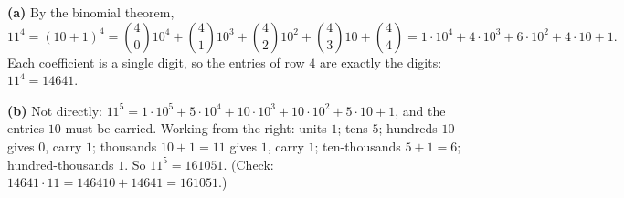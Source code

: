 \textbf{(a)} By the binomial theorem,
\[11^4=(10+1)^4=\binom40 10^4+\binom41 10^3+\binom42 10^2+\binom43 10+\binom44=1\cdot10^4+4\cdot10^3+6\cdot10^2+4\cdot10+1 .\]
Each coefficient is a single digit, so the entries of row $4$ are exactly the digits: $11^4=\boxed{14641}$.

\textbf{(b)} Not directly: $11^5=1\cdot10^5+5\cdot10^4+10\cdot10^3+10\cdot10^2+5\cdot10+1$, and the entries $10$ must be carried. Working from the right: units $1$; tens $5$; hundreds $10$ gives $0$, carry $1$; thousands $10+1=11$ gives $1$, carry $1$; ten-thousands $5+1=6$; hundred-thousands $1$. So $11^5=\boxed{161051}$. (Check: $14641\cdot11=146410+14641=161051$.)
